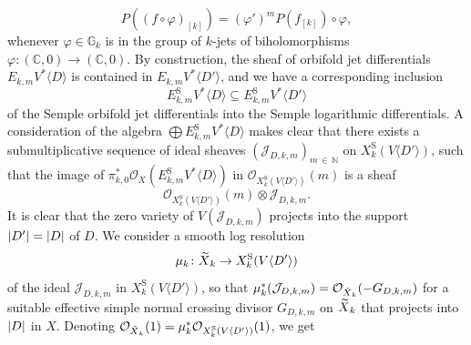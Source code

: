 \documentclass[AHL,Unicode,longabstracts,published]{cedram}
\DeclarePairedDelimiter{\abs}{\lvert}{\rvert}
\newcommand*\rS{\mathrm{S}}
\newcommand*\cJ{\mathcal{J}}
\newcommand*\cO{\mathcal{O}}
\newcommand*\bC{\mathbb{C}}
\newcommand*\bG{\mathbb{G}}
\newcommand*\bN{\mathbb{N}}
\let\oldtilde\tilde
\renewcommand*{\tilde}[1]{\mathchoice{\widetilde{#1}}{\widetilde{#1}}{\oldtilde{#1}}{\oldtilde{#1}}}
\begin{document}
\[
P((f\circ\varphi)_{[k]}) = (\varphi')^m P(f_{[k]})\circ \varphi,
\]
whenever $\varphi\in \bG_k$ is in the group of $k$-jets of biholomorphisms $\varphi\colon(\bC,0)\to(\bC,0)$. By construction, the sheaf of orbifold jet differentials $E_{k,m}V^*\langle D\rangle$ is contained in $E_{k,m}V^*\langle D'\rangle$, and we have a corresponding inclusion
\[
E^\rS_{k,m}V^*\langle D\rangle
\subseteq E^\rS_{k,m}V^*\langle D'\rangle
\]
of the Semple orbifold jet differentials into the Semple logarithmic differentials. A consideration of the algebra $\bigoplus E^\rS_{k,m}V^*\langle D\rangle$ makes clear that there exists a submultiplicative sequence of ideal sheaves $(\cJ_{D,k,m})_{m\,\in\,\bN}$ on $X^\rS_k(V\langle D'\rangle)$, such that the image of $\pi_{k,0}^*\cO_X(E^\rS_{k,m}V^*\langle D\rangle)$ in $\cO_{X^\rS_k(V\langle D'\rangle)}(m)$ is a sheaf
\[
\cO_{X^\rS_k(V\langle D'\rangle)}(m)\otimes\cJ_{D,k,m}.
\]
It is clear that the zero variety of $V(\cJ_{D,k,m})$ projects into the support $\abs{D'}=\abs{D}$ of $D$. We consider a smooth log resolution
\[
\mu_k
\colon
\tilde X_k
\to X^\rS_k(V\langle D'\rangle)
\]
of the ideal $\cJ_{D,k,m}$ in $X^\rS_k(V\langle D'\rangle)$, so that $\mu_k^*(\cJ_{D,k,m})=\cO_{\tilde X_k}(-G_{D,k,m})$ for a suitable effective simple normal crossing divisor $G_{D,k,m}$ on $\tilde X_k$ that projects into $\abs{D}$ in $X$. Denoting $\cO_{\tilde X_k}(1)=\mu_k^*\cO_{X^\rS_k(V\langle D'\rangle)}(1)$, we get
\end{document}
